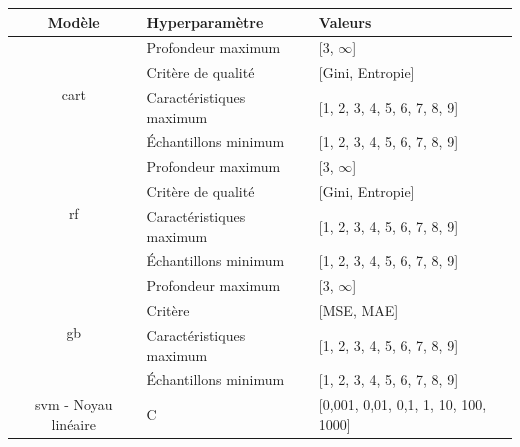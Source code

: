 \begin{table}[H]
    \centering
    \begin{tabular}{cll}
        \toprule
        \textbf{Modèle}                                 & \textbf{Hyperparamètre}   & \textbf{Valeurs}                          \\ \midrule
        \multirow{4}{*}{\gls{cart}}                     & Profondeur maximum        & [3, $\infty$]                             \\ \cmidrule{2-3} 
                                                        & Critère de qualité        & [Gini, Entropie]                          \\ \cmidrule{2-3}   
                                                        & Caractéristiques maximum  & [1, 2, 3, 4, 5, 6, 7, 8, 9]               \\ \cmidrule{2-3}   
                                                        & Échantillons minimum      & [1, 2, 3, 4, 5, 6, 7, 8, 9]               \\ \midrule 
        \multirow{4}{*}{\gls{rf}}                       & Profondeur maximum        & [3, $\infty$]                             \\ \cmidrule{2-3} 
                                                        & Critère de qualité        & [Gini, Entropie]                          \\ \cmidrule{2-3}   
                                                        & Caractéristiques maximum  & [1, 2, 3, 4, 5, 6, 7, 8, 9]               \\ \cmidrule{2-3}   
                                                        & Échantillons minimum      & [1, 2, 3, 4, 5, 6, 7, 8, 9]               \\ \midrule 
        \multirow{4}{*}{\gls{gb}}                       & Profondeur maximum        & [3, $\infty$]                             \\ \cmidrule{2-3}
                                                        & Critère                   & [MSE, MAE]                                \\ \cmidrule{2-3} 
                                                        & Caractéristiques maximum  & [1, 2, 3, 4, 5, 6, 7, 8, 9]               \\ \cmidrule{2-3}   
                                                        & Échantillons minimum      & [1, 2, 3, 4, 5, 6, 7, 8, 9]               \\ \midrule 
        \gls{svm} - Noyau linéaire                      & C                         & [0,001, 0,01, 0,1, 1, 10, 100, 1000]      \\ \midrule

\end{tabular}
\end{table}
